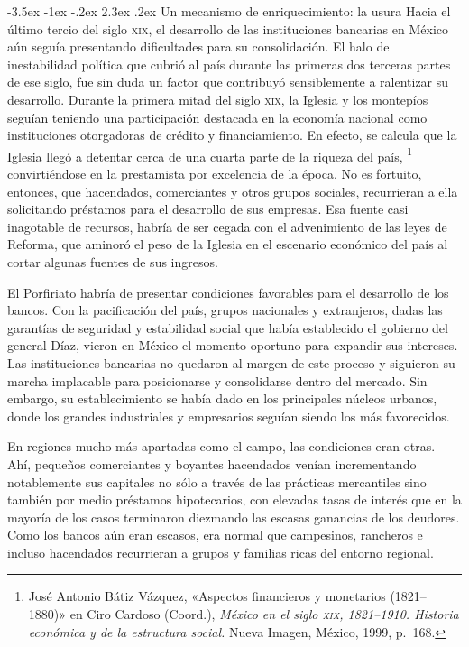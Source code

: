 \documentclass[14pt,twoside,final]{extbook} %
\makeatletter
\let\oldfootnote\footnote
\renewcommand\footnote[1]{%
\oldfootnote{\hspace{1mm}#1}}
\renewcommand\section{\@startsection {section}{1}{\z@}%
                                     {-3.5ex \@plus -1ex \@minus -.2ex}%
                                     {2.3ex \@plus .2ex}%
                                     {\normalfont\large\bfseries\sc}}
\makeatother
\begin{document}
\section{Un mecanismo de enriquecimiento: la usura}
\label{sec:usura}
Hacia el último tercio del siglo \textsc{xix}, el desarrollo de las instituciones bancarias en México aún seguía presentando dificultades para su consolidación. El halo de inestabilidad política que cubrió al país durante las primeras dos terceras partes de ese siglo, fue sin duda un factor que contribuyó sensiblemente a ralentizar su desarrollo. Durante la primera mitad del siglo \textsc{xix}, la Iglesia y los montepíos seguían teniendo una participación destacada en la economía nacional como instituciones otorgadoras de crédito y financiamiento. En efecto, se calcula que la Iglesia llegó a detentar cerca de una cuarta parte de la riqueza del país,\footnote{José Antonio Bátiz Vázquez, «Aspectos financieros y monetarios (1821--1880)» en Ciro Cardoso (Coord.), \emph{México en el siglo \textsc{xix}, 1821--1910. Historia económica y de la estructura social.} Nueva Imagen, México, 1999, p.~168.} convirtiéndose en la prestamista por excelencia de la época. No es fortuito, entonces, que hacendados, comerciantes y otros grupos sociales, recurrieran a ella solicitando préstamos para el desarrollo de sus empresas. Esa fuente casi inagotable de recursos, habría de ser cegada con el advenimiento de las leyes de Reforma, que aminoró el peso de la Iglesia en el escenario económico del país al cortar algunas fuentes de sus ingresos.

El Porfiriato habría de presentar condiciones favorables para el desarrollo de los bancos. Con la pacificación del país, grupos nacionales y extranjeros, dadas las garantías de seguridad y estabilidad social que había establecido el gobierno del general Díaz, vieron en México el momento oportuno para expandir sus intereses. Las instituciones bancarias no quedaron al margen de este proceso y siguieron su marcha implacable para posicionarse y consolidarse dentro del mercado. Sin embargo, su establecimiento se había dado en los principales núcleos urbanos, donde los grandes industriales y empresarios seguían siendo los más favorecidos.

En regiones mucho más apartadas como el campo, las condiciones eran otras. Ahí, pequeños comerciantes y boyantes hacendados venían incrementando notablemente sus capitales no sólo a través de las prácticas mercantiles sino también por medio préstamos hipotecarios, con elevadas tasas de interés que en la mayoría de los casos terminaron diezmando las escasas ganancias de los deudores. Como los bancos aún eran escasos, era normal que campesinos, rancheros e incluso hacendados recurrieran a grupos y familias ricas del entorno regional.
\end{document}
